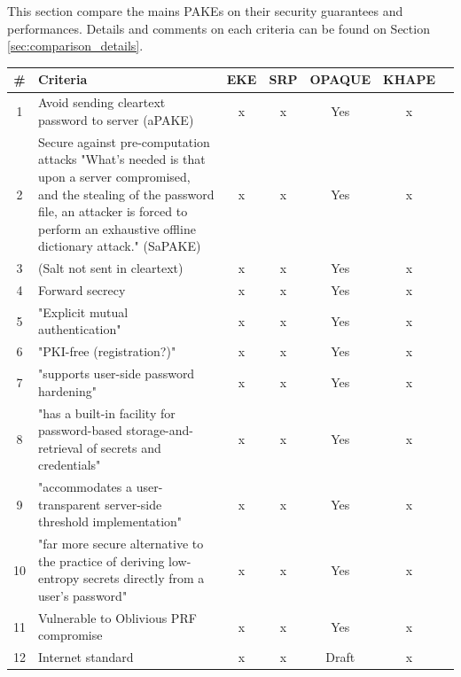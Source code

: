 \documentclass[../report.tex]{subfiles}
\begin{document}
\section{}

This section compare the mains PAKEs on their security guarantees and performances. Details and comments on each criteria can be found on Section \ref{sec:comparison_details}.

\begin{center}
   \begin{tabular}{ | c | p{8cm} || c | c | c | c | c | }
     \hline
     \textbf{\#} & \textbf{Criteria} & \textbf{EKE} & \textbf{SRP} & \textbf{OPAQUE} & \textbf{KHAPE} \\ \hline
     
     
     
     1 & Avoid sending cleartext password to server (aPAKE) & x & x & Yes & x \\ \hline
     
     2 & Secure against pre-computation attacks {"What's needed is that upon a server compromised, and the stealing of the password file, an attacker is forced to perform an exhaustive offline dictionary attack."} (SaPAKE) & x & x & Yes & x \\ \hline
     
     3 & (Salt not sent in cleartext) & x & x & Yes & x \\ \hline
     4 & Forward secrecy & x & x & Yes & x \\ \hline
     5 & "Explicit mutual authentication" & x & x & Yes & x \\ \hline
     6 & "PKI-free (registration?)" & x & x & Yes & x \\ \hline
     7 & "supports user-side password hardening" & x & x & Yes & x \\ \hline
     8 & "has a built-in facility for password-based storage-and-retrieval of secrets and credentials" & x & x & Yes & x \\ \hline
     9 & "accommodates a user-transparent server-side threshold implementation" & x & x & Yes & x \\ \hline
     10 &"far more secure alternative to the practice of deriving low-entropy secrets directly from a user's password" & x & x & Yes & x \\ \hline
     
     11 & Vulnerable to Oblivious PRF compromise & x & x & Yes & x \\ \hline
     12 & Internet standard & x & x & Draft & x \\ \hline
     

\end{tabular}
\end{center}
\end{document}
